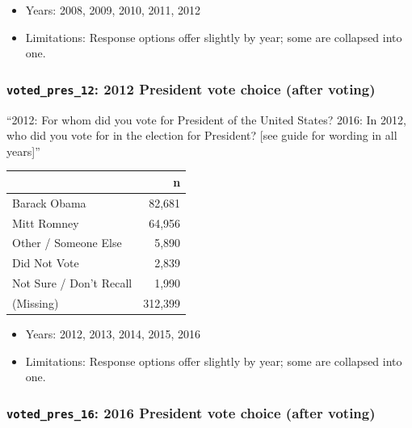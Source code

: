 \documentclass[10pt,article,oneside]{memoir}
\theoremstyle{definition}
\begin{document}
\begin{itemize}
\tightlist
\item
  Years: 2008, 2009, 2010, 2011, 2012
\item
  Limitations: Response options offer slightly by year; some are
  collapsed into one.
\end{itemize}

\hypertarget{voted_pres_12-2012-president-vote-choice-after-voting}{%
\subsubsection{\texorpdfstring{\texttt{voted\_pres\_12}: 2012 President
vote choice (after
voting)}{voted\_pres\_12: 2012 President vote choice (after voting)}}\label{voted_pres_12-2012-president-vote-choice-after-voting}}

``2012: For whom did you vote for President of the United States? 2016:
In 2012, who did you vote for in the election for President? {[}see
guide for wording in all years{]}''

\begin{table}[H]
\centering
\begin{tabular}{lr}
\toprule
 & n\\
\midrule
Barack Obama & 82,681\\
Mitt Romney & 64,956\\
Other / Someone Else & 5,890\\
Did Not Vote & 2,839\\
Not Sure / Don't Recall & 1,990\\
(Missing) & 312,399\\
\bottomrule
\end{tabular}
\end{table}

\begin{itemize}
\tightlist
\item
  Years: 2012, 2013, 2014, 2015, 2016
\item
  Limitations: Response options offer slightly by year; some are
  collapsed into one.
\end{itemize}

\hypertarget{voted_pres_16-2016-president-vote-choice-after-voting}{%
\subsubsection{\texorpdfstring{\texttt{voted\_pres\_16}: 2016 President
vote choice (after
voting)}{voted\_pres\_16: 2016 President vote choice (after voting)}}\label{voted_pres_16-2016-president-vote-choice-after-voting}}
\end{document}

